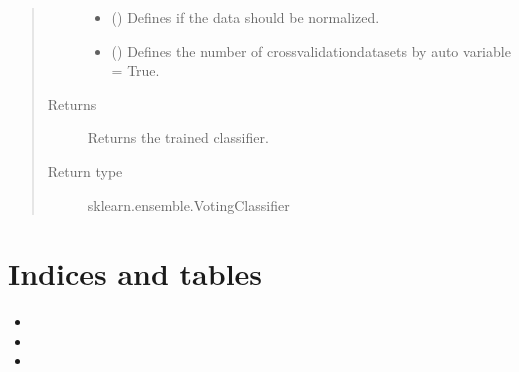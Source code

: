 \documentclass[letterpaper,10pt,english]{sphinxmanual}
\begin{document}
\begin{fulllineitems}
\begin{quote}
\begin{description}
\begin{itemize}
\item {} 
\sphinxAtStartPar
{} (\sphinxstyleliteralemphasis{\sphinxupquote{, }}) \textendash{} Defines if the data should be normalized.

\item {} 
\sphinxAtStartPar
{} (\sphinxstyleliteralemphasis{\sphinxupquote{, }}) \textendash{} Defines the number of cross\sphinxhyphen{}validation\sphinxhyphen{}datasets by auto variable = True.

\end{itemize}

\item[{Returns}] \leavevmode
\sphinxAtStartPar
Returns the trained classifier.

\item[{Return type}] \leavevmode
\sphinxAtStartPar
sklearn.ensemble.VotingClassifier

\end{description}\end{quote}

\end{fulllineitems}



\chapter{Indices and tables}
\label{\detokenize{index:indices-and-tables}}\begin{itemize}
\item {} 
\sphinxAtStartPar
{}

\item {} 
\sphinxAtStartPar
{}

\item {} 
\sphinxAtStartPar
{}

\end{itemize}
\end{document}
